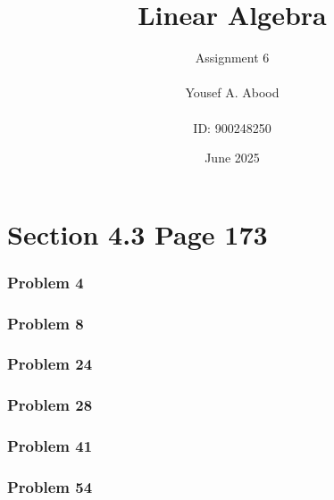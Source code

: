 \documentclass[a4paper,12pt]{article}
\title{Linear Algebra}
\author{Assignment 6\\ \\ Yousef A. Abood\\ \\ ID: 900248250}
\date{June 2025}
\begin{document}
\maketitle
\noindent\makebox[\linewidth]{\rule{15cm}{0.4pt}}

\section*{Section 4.3 Page 173}

\subsubsection*{Problem 4}

\subsubsection*{Problem 8}

\subsubsection*{Problem 24}

\subsubsection*{Problem 28}

\subsubsection*{Problem 41}

\subsubsection*{Problem 54}
\end{document}
